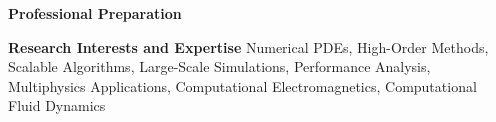 \documentclass[11pt,letterpaper,english]{article}
\begin{document}
\begin{flushleft} {\bf Professional Preparation}
\begin{enumerate}
\end{enumerate}

\vspace{-6pt}
{\bf Research Interests and Expertise}
{\parindent 16pt
Numerical PDEs, High-Order Methods, 
Scalable Algorithms,
Large-Scale Simulations, Performance Analysis, 
Multiphysics Applications,
Computational Electromagnetics, Computational Fluid Dynamics
}


\end{flushleft}
\end{document}
